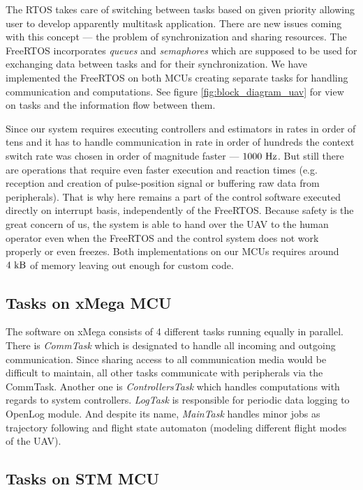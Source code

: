 The RTOS takes care of switching between tasks based on given priority allowing user to develop apparently multitask application. There are new issues coming with this concept --- the problem of synchronization and sharing resources. The FreeRTOS incorporates \textit{queues} and \textit{semaphores} which are supposed to be used for exchanging data between tasks and for their synchronization. We have implemented the FreeRTOS on both MCUs creating separate tasks for handling communication and computations. See figure \ref{fig:block_diagram_uav} for view on tasks and the information flow between them.

Since our system requires executing controllers and estimators in rates in order of tens and it has to handle communication in rate in order of hundreds the context switch rate was chosen in order of magnitude faster --- $1000~\mathrm{Hz}$. But still there are operations that require even faster execution and reaction times (e.g. reception and creation of pulse-position signal or buffering raw data from peripherals). That is why here remains a part of the control software executed directly on interrupt basis, independently of the FreeRTOS. Because safety is the great concern of us, the system is able to hand over the UAV to the human operator even when the FreeRTOS and the control system does not work properly or even freezes. Both implementations on our MCUs requires around $4~\mathrm{kB}$ of memory leaving out enough for custom code.

\subsection{Tasks on xMega MCU}

The software on xMega consists of 4 different tasks running equally in parallel. There is \emph{CommTask} which is designated to handle all incoming and outgoing communication. Since 	sharing access to all communication media would be difficult to maintain, all other tasks communicate with peripherals via the CommTask. Another one is \emph{ControllersTask} which handles computations with regards to system controllers. \emph{LogTask} is responsible for periodic data logging to OpenLog module. And despite its name, \emph{MainTask} handles minor jobs as trajectory following and flight state automaton (modeling different flight modes of the UAV). 

\subsection{Tasks on STM MCU}

